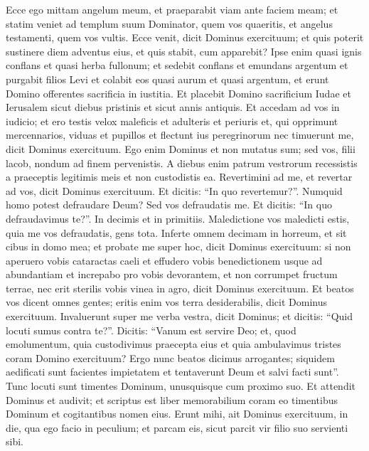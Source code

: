 \begin{biblechapter}
\begin{biblechapter}
\begin{biblechapter}
\verse Ecce ego mittam angelum meum, et praeparabit viam ante faciem meam; et statim veniet ad templum suum Dominator, quem vos quaeritis, et angelus testamenti, quem vos vultis. Ecce venit, dicit Dominus exercituum; 
\verse et quis poterit sustinere diem adventus eius, et quis stabit, cum apparebit? Ipse enim quasi ignis conflans et quasi herba fullonum; 
\verse et sedebit conflans et emundans argentum et purgabit filios Levi et colabit eos quasi aurum et quasi argentum, et erunt Domino offerentes sacrificia in iustitia. 
\verse Et placebit Domino sacrificium Iudae et Ierusalem sicut diebus pristinis et sicut annis antiquis. 
\verse Et accedam ad vos in iudicio; et ero testis velox maleficis et adulteris et periuris et, qui opprimunt mercennarios, viduas et pupillos et flectunt ius peregrinorum nec timuerunt me, dicit Dominus exercituum.
 \verse Ego enim Dominus et non mutatus sum;
 sed vos, filii lacob, nondum ad finem pervenistis.
 \verse A diebus enim patrum vestrorum
 recessistis a praeceptis legitimis meis et non custodistis ea.
 Revertimini ad me,
 et revertar ad vos,
 dicit Dominus exercituum.
 Et dicitis: “In quo revertemur?”.
 \verse Numquid homo potest defraudare Deum?
 Sed vos defraudatis me.
 Et dicitis: “In quo defraudavimus te?”.
 In decimis et in primitiis.
 \verse Maledictione vos maledicti estis,
 quia me vos defraudatis, gens tota.
 \verse Inferte omnem decimam in horreum,
 et sit cibus in domo mea;
 et probate me super hoc,
 dicit Dominus exercituum:
 si non aperuero vobis cataractas caeli
 et effudero vobis benedictionem usque ad abundantiam
 \verse et increpabo pro vobis devorantem,
 et non corrumpet fructum terrae,
 nec erit sterilis vobis vinea in agro,
 dicit Dominus exercituum.
 \verse Et beatos vos dicent omnes gentes;
 eritis enim vos terra desiderabilis,
 dicit Dominus exercituum.
 \verse Invaluerunt super me verba vestra, dicit Dominus; 
\verse et dicitis: “Quid locuti sumus contra te?”. Dicitis: “Vanum est servire Deo; et, quod emolumentum, quia custodivimus praecepta eius et quia ambulavimus tristes coram Domino exercituum? 
\verse Ergo nunc beatos dicimus arrogantes; siquidem aedificati sunt facientes impietatem et tentaverunt Deum et salvi facti sunt”. 
\verse Tunc locuti sunt timentes Dominum, unusquisque cum proximo suo. Et attendit Dominus et audivit; et scriptus est liber memorabilium coram eo timentibus Dominum et cogitantibus nomen eius. 
\verse Erunt mihi, ait Dominus exercituum, in die, qua ego facio in peculium; et parcam eis, sicut parcit vir filio suo servienti sibi. 

\end{biblechapter}
\end{biblechapter}
\end{biblechapter}
